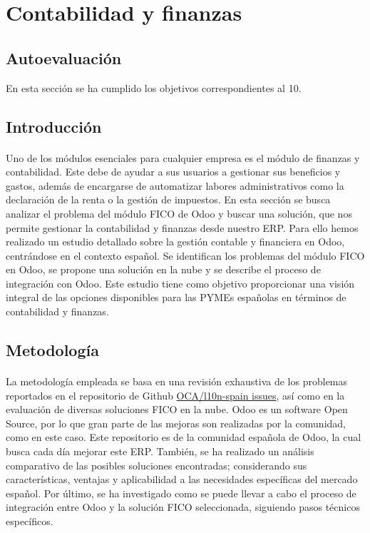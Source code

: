 \section{Contabilidad y finanzas}
\subsection{Autoevaluación}
En esta sección se ha cumplido los objetivos correspondientes al 10.
\subsection{Introducción}
\paragraph{}
Uno de los módulos esenciales para cualquier empresa es el módulo de finanzas y contabilidad. Este debe de ayudar a sus usuarios a gestionar sus beneficios y gastos, además de encargarse de automatizar labores administrativos como la declaración de la renta o la gestión de impuestos. En esta sección se busca analizar el problema del módulo FICO de Odoo y buscar una solución, que nos permite gestionar la contabilidad y finanzas desde nuestro ERP. Para ello hemos realizado un estudio detallado sobre la gestión contable y financiera en Odoo, centrándose en el contexto español. Se identifican los problemas del módulo FICO en Odoo, se propone una solución en la nube y se describe el proceso de integración con Odoo. Este estudio tiene como objetivo proporcionar una visión integral de las opciones disponibles para las PYMEs españolas en términos de contabilidad y finanzas.
\subsection{Metodología}
\paragraph{}
La metodología empleada se basa en una revisión exhaustiva de los problemas reportados en el repositorio de Github \href{https://github.com/OCA/l10n-spain/issues}{OCA/l10n-spain issues}, así como en la evaluación de diversas soluciones FICO en la nube. Odoo es un software Open Source, por lo que gran parte de las mejoras son realizadas por la comunidad, como en este caso. Este repositorio es de la comunidad española de Odoo, la cual busca cada día mejorar este ERP. También, se ha realizado un análisis comparativo de las posibles soluciones encontradas; considerando sus características, ventajas y aplicabilidad a las necesidades específicas del mercado español. Por último, se ha investigado como se puede llevar a cabo el proceso de integración entre Odoo y la solución FICO seleccionada, siguiendo pasos técnicos específicos.
